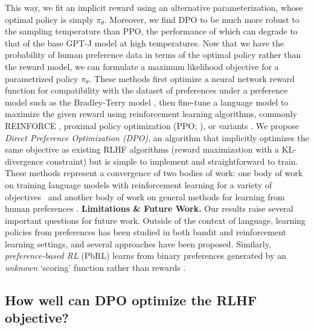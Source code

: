 This way, we fit an implicit reward using an alternative parameterization, whose optimal policy is simply $\pi_\theta$. Moreover, we find DPO to be much more robust to the sampling temperature than PPO, the performance of which can degrade to that of the base GPT-J model at high temperatures. Now that we have the probability of human preference data in terms of the optimal policy rather than the reward model, we can formulate a maximum likelihood objective for a parametrized policy $\pi_\theta$. These methods first optimize a neural network reward function for compatibility with the dataset of preferences under a preference model such as the Bradley-Terry model \citep{bradley1952rankanalysis}, then fine-tune a language model to maximize the given reward using reinforcement learning algorithms, commonly REINFORCE \citep{williams1992reinforce}, proximal policy optimization (PPO; \cite{schulman2017proximal}), or variants \citep{ramamurthy2023is}. We propose
\textit{{Direct Preference Optimization} (DPO)}, an algorithm that implicitly optimizes the same objective as existing RLHF algorithms (reward maximization with a KL-divergence constraint) but is simple to implement and straightforward to train. These methods represent a convergence of two bodies of work: one body of work on training language models with reinforcement learning for a variety of objectives~\citep{Ranzato2015SequenceLT,paulus2018a,wu2018learning} and another body of work on general methods for learning from human preferences \citep{christiano2017deep,kupcsik2018learning}. \textbf{Limitations \& Future Work.} Our results raise several important questions for future work. Outside of the context of language, learning policies from preferences has been studied in both bandit and reinforcement learning settings, and several approaches have been proposed. Similarly, \textit{preference-based RL} (PbRL) learns from binary preferences generated by an \textit{unknown} `scoring' function rather than rewards \citep{BusaFekete2014,ruiz2023dueling}. \subsection{How well can DPO optimize the RLHF objective?}

